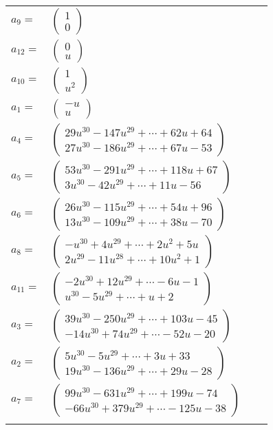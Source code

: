 \documentclass[1p]{elsarticle_modified}
\theoremstyle{definition}
\begin{document}
\begin{tabular}{m{7pt} m{180pt} m{7pt} m{180pt} }
\flushright $a_{9}=$&$\begin{pmatrix}1\\0\end{pmatrix}$ \\
\flushright $a_{12}=$&$\begin{pmatrix}0\\u\end{pmatrix}$ \\
\flushright $a_{10}=$&$\begin{pmatrix}1\\u^2\end{pmatrix}$ \\
\flushright $a_{1}=$&$\begin{pmatrix}- u\\u\end{pmatrix}$ \\
\flushright $a_{4}=$&$\begin{pmatrix}29 u^{30}-147 u^{29}+\cdots+62 u+64\\27 u^{30}-186 u^{29}+\cdots+67 u-53\end{pmatrix}$ \\
\flushright $a_{5}=$&$\begin{pmatrix}53 u^{30}-291 u^{29}+\cdots+118 u+67\\3 u^{30}-42 u^{29}+\cdots+11 u-56\end{pmatrix}$ \\
\flushright $a_{6}=$&$\begin{pmatrix}26 u^{30}-115 u^{29}+\cdots+54 u+96\\13 u^{30}-109 u^{29}+\cdots+38 u-70\end{pmatrix}$ \\
\flushright $a_{8}=$&$\begin{pmatrix}- u^{30}+4 u^{29}+\cdots+2 u^2+5 u\\2 u^{29}-11 u^{28}+\cdots+10 u^2+1\end{pmatrix}$ \\
\flushright $a_{11}=$&$\begin{pmatrix}-2 u^{30}+12 u^{29}+\cdots-6 u-1\\u^{30}-5 u^{29}+\cdots+u+2\end{pmatrix}$ \\
\flushright $a_{3}=$&$\begin{pmatrix}39 u^{30}-250 u^{29}+\cdots+103 u-45\\-14 u^{30}+74 u^{29}+\cdots-52 u-20\end{pmatrix}$ \\
\flushright $a_{2}=$&$\begin{pmatrix}5 u^{30}-5 u^{29}+\cdots+3 u+33\\19 u^{30}-136 u^{29}+\cdots+29 u-28\end{pmatrix}$ \\
\flushright $a_{7}=$&$\begin{pmatrix}99 u^{30}-631 u^{29}+\cdots+199 u-74\\-66 u^{30}+379 u^{29}+\cdots-125 u-38\end{pmatrix}$\\&\end{tabular}
\end{document}
